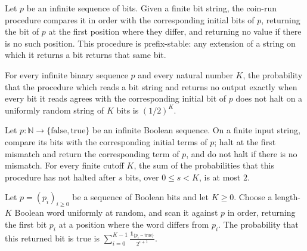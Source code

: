 \begin{theorem}
\label{Randomized.rhoCoinRun_isPrefixStable}
\leanok
{}
Let $p$ be an infinite sequence of bits. Given a finite bit string, the coin-run
procedure compares it in order with the corresponding initial bits of $p$, returning the
bit of $p$ at the first position where they differ, and returning no value if there is
no such position. This procedure is prefix-stable: any extension of a string on which it
returns a bit returns that same bit.
\end{theorem}

\begin{theorem}
\label{Randomized.notHaltedProb_rhoCoinRun}
\leanok
{}
For every infinite binary sequence $p$ and every natural number $K$, the probability
that the procedure which reads a bit string and returns no output exactly when every bit
it reads agrees with the corresponding initial bit of $p$ does not halt on a uniformly
random string of $K$ bits is $(1/2)^K$.
\end{theorem}

\begin{theorem}
\label{Randomized.expTimeLe_rhoCoinRun}
\leanok
{}
Let $p:\mathbb{N}\to\{\mathrm{false},\mathrm{true}\}$ be an infinite Boolean sequence.
On a finite input string, compare its bits with the corresponding initial terms of $p$;
halt at the first mismatch and return the corresponding term of $p$, and do not halt if
there is no mismatch. For every finite cutoff $K$, the sum of the probabilities that
this procedure has not halted after $s$ bits, over $0\le s<K$, is at most $2$.
\end{theorem}

\begin{theorem}
\label{Randomized.randProb_rhoCoinRun_eq_sum}
\leanok
{}
Let $p=(p_i)_{i\ge 0}$ be a sequence of Boolean bits and let $K\ge 0$. Choose a
length-$K$ Boolean word uniformly at random, and scan it against $p$ in order, returning
the first bit $p_i$ at a position where the word differs from $p_i$. The probability
that this returned bit is true is $\displaystyle\sum_{i=0}^{K-1}\frac{\mathbf
1_{\{p_i=\mathrm{true}\}}}{2^{i+1}}$.
\end{theorem}


